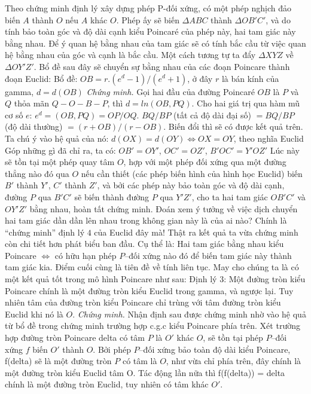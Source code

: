 \documentclass{article}
\begin{document}
	Theo chứng minh định lý xây dựng phép P-đối xứng, có một phép nghịch đảo biến $A$ thành $O$ nếu $A$ khác $O$. Phép ấy sẽ biến $\Delta ABC$ thành $\Delta OB'C'$, và do tính bảo toàn góc và độ dài cạnh kiểu Poincaré của phép này, hai tam giác này bằng nhau. Để ý quan hệ bằng nhau của tam giác sẽ có tính bắc cầu từ việc quan hệ bằng nhau của góc và cạnh là bắc cầu. Một cách tương tự ta đẩy $\Delta XYZ$ về $ \Delta OY'Z'$.
	\vskip 0.1cm
	Bổ đề sau đây sẽ chuyển sự bằng nhau của các đoạn Poincare thành đoạn Euclid:
	\vskip 0.1cm
	Bổ đề: $OB = r.(e^d -1)/(e^d+1)$, ở đây $r$ là bán kính của gamma, $d = d(OB)$
	\vskip 0.1cm
	\textit{Chứng minh.} Gọi hai đầu của đường Poincaré $OB$ là $P$ và $Q$ thỏa mãn $Q - O - B - P$, thì $d = ln(OB, PQ)$.
	Cho hai giá trị qua hàm mũ cơ số $e$:
	$e^d = (OB, PQ) = OP/OQ$. $BQ/BP$ (tất cả độ dài đại số) $= BQ/BP$ (độ dài thường) $= (r + OB)/(r-OB)$.
	Biến đổi thì sẽ có được kết quả trên.
	Ta chú ý vào hệ quả của nó: $d(OX) = d(OY) \Leftrightarrow OX = OY$, theo nghĩa Euclid
	\vskip 0.1cm
	Góp những gì đã chỉ ra, ta có: $OB' = OY'$, $OC' = OZ'$, $B'OC' = Y'OZ'$
	\vskip 0.1cm
	Lúc này sẽ tồn tại một phép quay tâm $O$, hợp với một phép đối xứng qua một đường thẳng nào đó qua $O$ nếu cần thiết (các phép biến hình của hình học Euclid) biến $B'$ thành $Y'$, $C'$ thành $Z'$, và bởi các phép này bảo toàn góc và độ dài cạnh, đường $P$ qua $B'C'$ sẽ biến thành đường $P$ qua $Y'Z'$, cho ta hai tam giác $OB'C'$ và $OY'Z'$ bằng nhau, hoàn tất chứng minh.
	\vskip 0.1cm
	Đoán xem ý tưởng về việc dịch chuyển hai tam giác dần dần lên nhau trong không gian này là của ai nào? Chính là ``chứng minh'' định lý $4$ của Euclid đây mà!
	Thật ra kết quả ta vừa chứng minh còn chi tiết hơn phát biểu ban đầu. Cụ thể là:
	\vskip 0.1cm
	Hai tam giác bằng nhau kiểu Poincare $\Leftrightarrow$ có hữu hạn phép $P$--đối xứng nào đó để biến tam giác này thành tam giác kia.
	\vskip 0.1cm
	Điểm cuối cùng là tiên đề về tính liên tục. May cho chúng ta là có một kết quả tốt trong mô hình Poincare như sau:
	\vskip 0.1cm
	Định lý $3$: Một đường tròn kiểu Poincare chính là một đường tròn kiểu Euclid trong gamma, và ngược lại. Tuy nhiên tâm của đường tròn kiểu Poincare chỉ trùng với tâm đường tròn kiểu Euclid khi nó là $O$.
	\vskip 0.1cm
	\textit{Chứng minh.} Nhận định sau được chứng minh nhờ vào hệ quả từ bổ đề trong chứng minh trường hợp c.g.c kiểu Poincare phía trên. 
	Xét trường hợp đường tròn Poincare delta có tâm $P$ là $O'$ khác $O$, sẽ tồn tại phép $P$--đối xứng $f$ biến $O'$ thành $O$. Bởi phép $P$--đối xứng bảo toàn độ dài kiểu Poincare, f(delta) sẽ là một đường tròn $P$ có tâm là $O$, như vừa chỉ phía trên, đây chính là một đường tròn kiểu Euclid tâm O. Tác động lần nữa thì f(f(delta)) = delta chính là một đường tròn Euclid, tuy nhiên có tâm khác $O'$.
\end{document}
